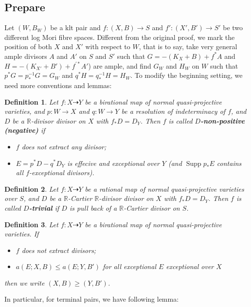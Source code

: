 \documentclass{article}
\newtheorem{defn}{Definition}[subsection]
\begin{document}
\subsection{Prepare}
Let $(W,B_W)$ be a klt pair and $f:(X,B)\to S$ and $f':(X',B')\to S'$ be two different log Mori fibre spaces. Different from the original proof, we mark the position of both $X$ and $X'$ with respect to $W$, that is to say, take  very general ample divisors $ A $ and $ A' $ on $ S $ and $ S' $ such that $ G=-(K_X+B)+f^*A $ and $ H=-(K_{X'}+B')+f^{'*}A' $) are ample, and find $ G_W $ and $ H_W $ on $ W $ such that $ p^*G=p^{-1}_*G=G_W $ and $ q^*H=q^{-1}_*H=H_W $. To modify the beginning setting, we need more conventions and lemmas:
\begin{defn}\label{negativemap}
Let $f:X\dashrightarrow Y$ be a birational map of normal quasi-projective varieties, and $p:W\to X$ and $q:W\to Y$ be a resolution of indeterminacy of $f$, and $D$ be a $\mathbb{R}$-divisor divisor on $X$ with $f_*D=D_Y$. Then $f$ is called \textbf{$D$-non-positive (negative)} if
\begin{itemize}
  \item $f$ does not extract any divisor;
  \item $E=p^{*}D-q^*D_Y$ is effecive and exceptional over $Y$ (and $\operatorname{Supp}p_*E$ contains all $f$-exceptional divisors).
\end{itemize}
\end{defn}
\begin{defn}\label{trivialmap}
  Let $f:X\dashrightarrow Y$ be a rational map of normal quasi-projective varieties over $S$, and $D$ be a $\mathbb{R}$-Cartier $\mathbb{R}$-divisor divisor on $X$ with $f_*D=D_Y$. Then $f$ is called \textbf{$D$-trivial} if $D$ is pull back of a $\mathbb{R}$-Cartier divisor on $S$.
\end{defn}
\begin{defn}
Let $f:X\dashrightarrow Y$ be a birational map of normal quasi-projective varieties. If
\begin{itemize}
  \item $f$ does not extract divisors;
  \item $a(E;X,B)\leqslant a(E;Y,B')$ for all exceptional $E$ exceptional over $X$ 
\end{itemize}
then we write $(X,B)\geqslant (Y,B')$.
\end{defn}
In particular, for terminal pairs, we have following lemma: 
\end{document}
